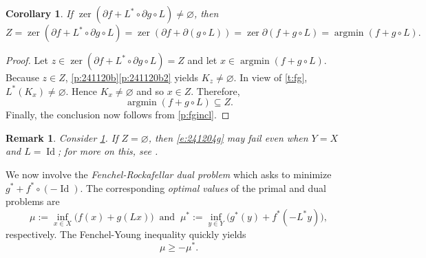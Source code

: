 \documentclass{article}
\DeclareMathOperator*{\argmin}{argmin}
\newcommand{\zer}{\ensuremath{\operatorname{zer}}}
\newcommand{\Id}{\ensuremath{\operatorname{Id}}}
\newtheorem{corollary}[theorem]{Corollary}
\newtheorem{remark}[theorem]{Remark}
\begin{document}
\begin{corollary}
\label{c:fg}
If $\zer(\partial f+L^*\circ \partial g\circ L)\neq\varnothing$, then 
\begin{equation}
\label{e:241204g}
Z = \zer(\partial f + L^*\circ\partial g\circ L)
= 
\zer(\partial f+\partial(g\circ L))
= 
\zer\partial(f+g\circ L) = 
\argmin (f+g\circ L). 
\end{equation}
\end{corollary}
\begin{proof}
Let $z\in \zer(\partial f+L^*\circ \partial g\circ L) = Z$ and
let $x\in \argmin (f+g\circ L)$. 
Because $z\in Z$, 
\cref{p:241120b}\cref{p:241120b2} yields
$K_z\neq\varnothing$. 
In view of \cref{t:fg}, $L^*(K_x)\neq\varnothing$. 
Hence $K_x\neq\varnothing$ and so $x \in Z$. 
Therefore, 
\begin{equation}
\argmin (f+g\circ L) \subseteq Z.
\end{equation}
Finally, the conclusion now follows from \cref{p:fgincl}. 
\end{proof}

\begin{remark}
Consider \cref{c:fg}. 
If 
$Z=\varnothing$, then \cref{e:241204g} may fail 
even when $Y=X$ and $L=\Id$; for more on this, 
see \cite[Chapter~13]{BMBook}. 
\end{remark}

We now involve the \emph{Fenchel-Rockafellar dual problem} which asks to 
minimize $g^* + f^*\circ(-\Id)$. 
The corresponding \emph{optimal values} of 
the primal and dual problems are 
\begin{equation}
\mu := \inf_{x\in X}\big(f(x)+g(Lx) \big)
\;\;\text{and}\;\;
\mu^* := \inf_{y\in Y}\big(g^*(y)+f^*(-L^*y) \big), 
\end{equation}
respectively. 
The Fenchel-Young inequality quickly yields
\begin{equation}
\label{e:mumu*}
\mu\geq -\mu^*.
\end{equation}
\end{document}
